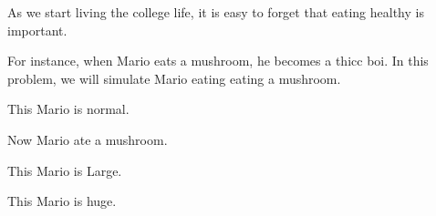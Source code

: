 
As we start living the college life, it is easy to forget that eating healthy is important.

For instance, when Mario eats a mushroom, he becomes a thicc boi. In this problem, we will simulate Mario eating eating a mushroom.

This Mario is normal.

Now Mario ate a {\tiny mushroom}. %

This Mario is Large. 

This Mario is huge.